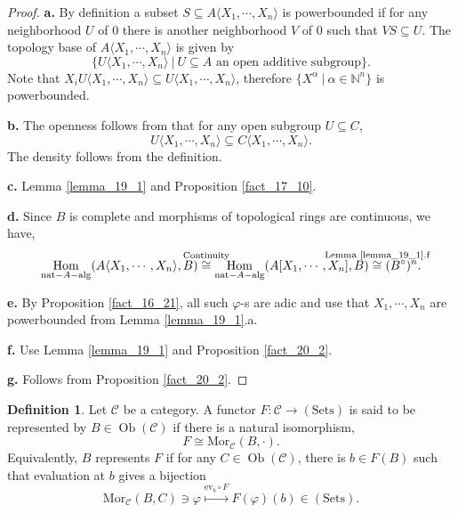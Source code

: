 \documentclass[10pt]{article}
\numberwithin{equation}{section}
\theoremstyle{definition}
\newtheorem{definition}{Definition}[subsection]
\DeclareMathOperator{\Hom}{Hom}
\DeclareMathOperator{\Ob}{Ob}
\newcommand{\N}[0]{\mathbb{N}}
\newcommand{\sep}[0]{\:|\:}
\newcommand{\sC}[0]{\mathscr{C}}
\newcommand{\comppol}[1]{\langle X_1,\cdots, X_{#1}\rangle}
\begin{document}
\begin{proof}
    \textbf{a.} By definition a subset $S\subseteq A\langle X_1,\cdots,X_n\rangle$ is powerbounded if for any neighborhood $U$ of $0$ there is another neighborhood $V$ of $0$ such that $VS\subseteq U$. The topology base of $A\langle X_1,\cdots,X_n\rangle$ is given by
    \begin{equation*}
    \{U\langle X_1,\cdots,X_n\rangle\sep U\subseteq A\text{ an open additive subgroup}\}.
    \end{equation*}
    Note that $X_i U\langle X_1,\cdots,X_n\rangle\subseteq U\langle X_1,\cdots,X_n\rangle$, therefore $\{X^\alpha\sep \alpha\in\N^n\}$ is powerbounded.
    \par\textbf{b.} The openness follows from that for any open subgroup $U\subseteq C$,
    \begin{equation*}
        U\comppol{n}\subseteq C\comppol{n}.
    \end{equation*}
    The density follows from the definition.
    \par\textbf{c.} Lemma \ref{lemma_19_1} and Proposition \ref{fact_17_10}.
    \par\textbf{d.} Since $B$ is complete and morphisms of topological rings are continuous, we have,
    \begin{equation*}
        \Hom_{\mathrm{nat-}A\mathrm{-alg}}(A\comppol{n},B)\stackrel{\text{\makebox[0pt][c]{Continuity}}}{\cong} \Hom_{\mathrm{nat-}A\mathrm{-alg}}(A[X_1,\cdots,X_n],B)\stackrel{\text{\makebox[0pt][c]{Lemma \ref{lemma_19_1}.f}}}{\cong}(B^\circ)^n.
    \end{equation*}
    \par\textbf{e.} By Proposition \ref{fact_16_21}, all such $\varphi$-s are adic and use that $X_1,\cdots,X_n$ are powerbounded from Lemma \ref{lemma_19_1}.a.
    \par\textbf{f.} Use Lemma \ref{lemma_19_1} and Proposition \ref{fact_20_2}.
    \par\textbf{g.} Follows from Proposition \ref{fact_20_2}.
\end{proof}
\begin{definition}
    Let $\sC$ be a category. A functor $F:\sC\to(\mathrm{Sets})$ is said to be represented by $B\in\Ob(\sC)$ if there is a natural isomorphism,
    \begin{equation*}
        F\cong \mathrm{Mor}_\sC(B,\cdot).
    \end{equation*}
    Equivalently, $B$ represents $F$ if for any $C\in\Ob(\sC)$, there is $b\in F(B)$ such that evaluation at $b$ gives a bijection
    \begin{equation*}
        \mathrm{Mor}_\sC(B,C)\ni\varphi\stackrel{\mathrm{ev}_b\circ F}{\mapsto}F(\varphi)(b)\in(\mathrm{Sets}).
    \end{equation*}
\end{definition}
\end{document}
